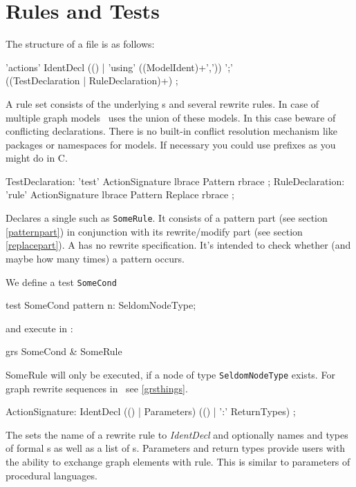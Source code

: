 \section{Rules and Tests}
\label{ruledecls}
The structure of a  file is as follows:
\begin{rail}
  'actions' IdentDecl (() | 'using' ((ModelIdent)+',')) ';' \\ ((TestDeclaration | RuleDeclaration)+) ;
\end{rail}
A rule set consists of the underlying s and several rewrite rules. In case of multiple graph models \GrG\ uses the union of these models. In this case beware of conflicting declarations. There is no built-in conflict resolution mechanism like packages or namespaces for models. If necessary you could use prefixes as you might do in C.

\begin{rail}
  TestDeclaration: 'test' ActionSignature lbrace Pattern rbrace ;
  RuleDeclaration: 'rule' ActionSignature lbrace Pattern Replace rbrace ;
\end{rail}
Declares a single  such as \texttt{SomeRule}. It consists of a pattern part (see section \ref{patternpart}) in conjunction with its rewrite/modify part (see section \ref{replacepart}). A  has no rewrite specification. It's intended to check whether (and maybe how many times) a pattern occurs.
\begin{example}
We define a test \texttt{SomeCond}
\begin{grgen}
test SomeCond {
  pattern {
    n: SeldomNodeType;
  }
}
\end{grgen}
and execute in \GrShell:
\begin{grshell}
  grs SomeCond & SomeRule
\end{grshell}
SomeRule will only be executed, if a node of type \texttt{SeldomNodeType} exists. For graph rewrite sequences in \GrShell\ see \ref{grsthings}.
\end{example}

\begin{rail}  
  ActionSignature: IdentDecl (() | Parameters) (() | ':' ReturnTypes) ;
\end{rail}
The  sets the name of a rewrite rule to \emph{IdentDecl} and optionally names and types of formal s as well as a list of s. Parameters and return types provide users with the ability to exchange graph elements with rule. This is similar to parameters of procedural languages.

